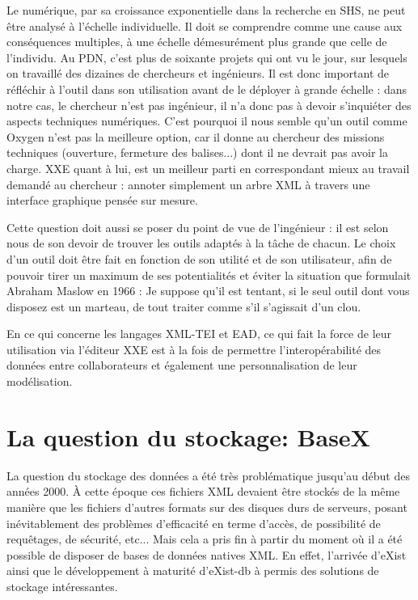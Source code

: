 \documentclass[a4paper,12pt,twoside]{book}
\begin{document}
    
    Le numérique, par sa croissance exponentielle dans la recherche en SHS, ne peut être analysé à l'échelle individuelle. Il doit se comprendre comme une cause aux conséquences multiples, à une échelle démesurément plus grande que celle de l'individu. Au \acrshort{PDN}, c'est plus de soixante projets qui ont vu le jour, sur lesquels on travaillé des dizaines de chercheurs et ingénieurs. Il est donc important de réfléchir à l'outil dans son utilisation avant de le déployer à grande échelle : dans notre cas, le chercheur n'est pas ingénieur, il n'a donc pas à devoir s'inquiéter des aspects techniques numériques. C'est pourquoi il nous semble qu'un outil comme Oxygen n'est pas la meilleure option, car il donne au chercheur des missions techniques (ouverture, fermeture des balises...) dont il ne devrait pas avoir la charge. \acrshort{XXE} quant à lui, est un meilleur parti en correspondant mieux au travail demandé au chercheur : annoter simplement un arbre \acrshort{XML} à travers une interface graphique pensée sur mesure.
    
    Cette question doit aussi se poser du point de vue de l'ingénieur : il est selon nous de son devoir de trouver les outils adaptés à la tâche de chacun. Le choix d'un outil doit être fait en fonction de son utilité et de son utilisateur, afin de pouvoir tirer un maximum de ses potentialités et éviter la situation que formulait Abraham Maslow en 1966 : \og Je suppose qu'il est tentant, si le seul outil dont vous disposez est un marteau, de tout traiter comme s'il s'agissait d'un clou.\fg
    
    En ce qui concerne les langages XML-TEI et EAD, ce qui fait la force de leur utilisation via l'éditeur XXE est à la fois de permettre l'interopérabilité des données entre collaborateurs et également une personnalisation de leur modélisation.
    
    \section{La question du stockage: BaseX\label{basex}}
    
    La question du stockage des données a été très problématique jusqu'au début des années 2000. À cette époque ces fichiers \acrshort{XML} devaient être stockés de la même manière que les fichiers d'autres formats sur des disques durs de serveurs, posant inévitablement des problèmes d'efficacité en terme d'accès, de possibilité de requêtages, de sécurité, etc... Mais cela a pris fin à partir du moment où il a été possible de disposer de bases de données natives \acrshort{XML}. En effet, l'arrivée d'eXist ainsi que le développement à maturité d'eXist-db à permis des solutions de stockage intéressantes. 
    
\end{document}
